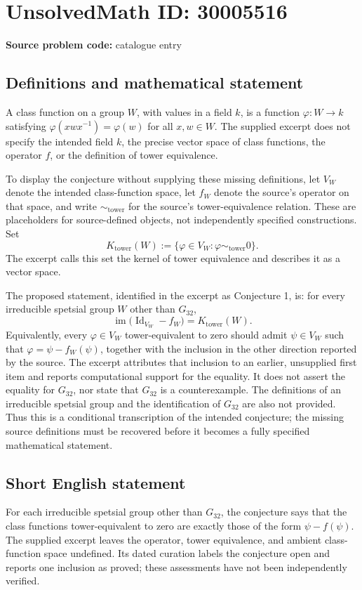 \documentclass[11pt]{article}
\begin{document}
\section*{UnsolvedMath ID: 30005516}
\textbf{Source problem code:} catalogue entry
\subsection{Definitions and mathematical statement}
A class function on a group \(W\), with values in a field \(k\), is a function \(\varphi\colon W\to k\) satisfying \(\varphi(xwx^{-1})=\varphi(w)\) for all \(x,w\in W\). The supplied excerpt does not specify the intended field \(k\), the precise vector space of class functions, the operator \(f\), or the definition of tower equivalence.

To display the conjecture without supplying these missing definitions, let \(V_W\) denote the intended class-function space, let \(f_W\) denote the source's operator on that space, and write \(\sim_{\mathrm{tower}}\) for the source's tower-equivalence relation. These are placeholders for source-defined objects, not independently specified constructions. Set
\[
K_{\mathrm{tower}}(W):=\{\varphi\in V_W: \varphi\sim_{\mathrm{tower}}0\}.
\]
The excerpt calls this set the kernel of tower equivalence and describes it as a vector space.

The proposed statement, identified in the excerpt as Conjecture 1, is: for every irreducible spetsial group \(W\) other than \(G_{32}\),
\[
\operatorname{im}\bigl(\operatorname{Id}_{V_W}-f_W\bigr)
=
K_{\mathrm{tower}}(W).
\]
Equivalently, every \(\varphi\in V_W\) tower-equivalent to zero should admit \(\psi\in V_W\) such that \(\varphi=\psi-f_W(\psi)\), together with the inclusion in the other direction reported by the source. The excerpt attributes that inclusion to an earlier, unsupplied first item and reports computational support for the equality. It does not assert the equality for \(G_{32}\), nor state that \(G_{32}\) is a counterexample. The definitions of an irreducible spetsial group and the identification of \(G_{32}\) are also not provided. Thus this is a conditional transcription of the intended conjecture; the missing source definitions must be recovered before it becomes a fully specified mathematical statement.
\subsection{Short English statement}
For each irreducible spetsial group other than \(G_{32}\), the conjecture says that the class functions tower-equivalent to zero are exactly those of the form \(\psi-f(\psi)\). The supplied excerpt leaves the operator, tower equivalence, and ambient class-function space undefined. Its dated curation labels the conjecture open and reports one inclusion as proved; these assessments have not been independently verified.
\end{document}

